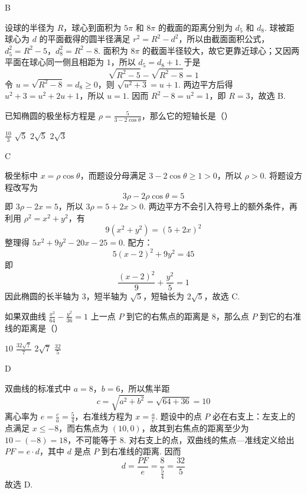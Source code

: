 \documentclass[UTF8,a4paper,oneside,11pt]{ctexbook}
\begin{document}
\begin{answer}
B
\end{answer}

\begin{solution}
设球的半径为 \(R\)，球心到面积为 \(5\pi\) 和 \(8\pi\) 的截面的距离分别为 \(d_5\) 和 \(d_8\). 球被距球心为 \(d\) 的平面截得的圆半径满足 \(r^2=R^2-d^2\)，所以由截面面积公式，
\(d_5^2=R^2-5\)，\(d_8^2=R^2-8\).
面积为 \(8\pi\) 的截面半径较大，故它更靠近球心；又因两平面在球心同一侧且相距为 \(1\)，所以 \(d_5=d_8+1\). 于是
\[
\sqrt{R^2-5}-\sqrt{R^2-8}=1
\]
令 \(u=\sqrt{R^2-8}=d_8\geqslant0\)，则 \(\sqrt{u^2+3}=u+1\). 两边平方后得 \(u^2+3=u^2+2u+1\)，所以 \(u=1\). 因而 \(R^2-8=u^2=1\)，即 \(R=3\)，故选 B.
\end{solution}

\begin{problem}
已知椭圆的极坐标方程是 \(\rho = \frac{5}{3 - 2\cos \theta}\)，那么它的短轴长是（\quad）

\choices
    {\(\frac{10}{3}\)}
    {\(\sqrt{5}\)}
    {\(2\sqrt{5}\)}
    {\(2\sqrt{3}\)}
\end{problem}

\begin{answer}
C
\end{answer}

\begin{solution}
极坐标中 \(x=\rho\cos\theta\)，而题设分母满足 \(3-2\cos\theta\geqslant1>0\)，所以 \(\rho>0\). 将题设方程改写为
\[
3\rho-2\rho\cos\theta=5
\]
即 \(3\rho-2x=5\)，所以 \(3\rho=5+2x>0\). 两边平方不会引入符号上的额外条件，再利用 \(\rho^2=x^2+y^2\)，有
\[
9(x^2+y^2)=(5+2x)^2
\]
整理得 \(5x^2+9y^2-20x-25=0\). 配方：
\[
5(x-2)^2+9y^2=45
\]
即
\[
\frac{(x-2)^2}{9}+\frac{y^2}{5}=1
\]
因此椭圆的长半轴为 \(3\)，短半轴为 \(\sqrt5\)，短轴长为 \(2\sqrt5\)，故选 C.
\end{solution}

\begin{problem}
如果双曲线 \(\frac{x^2}{64} - \frac{y^2}{36} = 1\) 上一点 \(P\) 到它的右焦点的距离是 \(8\)，那么点 \(P\) 到它的右准线的距离是（\quad）

\choices
    {\(10\)}
    {\(\frac{32\sqrt{7}}{7}\)}
    {\(2\sqrt{7}\)}
    {\(\frac{32}{5}\)}
\end{problem}

\begin{answer}
D
\end{answer}

\begin{solution}
双曲线的标准式中 \(a=8\)，\(b=6\)，所以焦半距
\[
c=\sqrt{a^2+b^2}=\sqrt{64+36}=10
\]
离心率为 \(e=\frac{c}{a}=\frac54\)，右准线方程为 \(x=\frac{a}{e}\). 题设中的点 \(P\) 必在右支上：左支上的点满足 \(x\leqslant-8\)，而右焦点为 \((10,0)\)，故其到右焦点的距离至少为 \(10-(-8)=18\)，不可能等于 \(8\). 对右支上的点，双曲线的焦点—准线定义给出 \(PF=e\cdot d\)，其中 \(d\) 是点 \(P\) 到右准线的距离. 因而
\[
d=\frac{PF}{e}=\frac{8}{\frac54}=\frac{32}{5}
\]
故选 D.
\end{solution}
\end{document}
